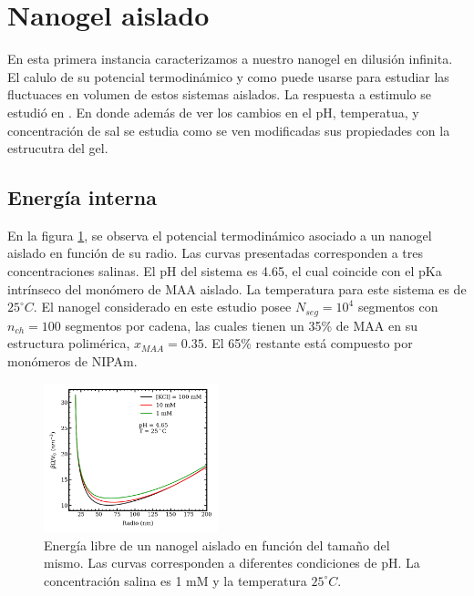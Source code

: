 	
	\section{Nanogel aislado}
	
	En esta primera instancia caracterizamos a nuestro nanogel en dilusi\'on infinita. El calulo de su potencial termodin\'amico y como puede usarse para estudiar las fluctuaces en volumen de estos sistemas aislados.
	La respuesta a estimulo se estudi\'o en \cite{perez2021thermodynamic}. En donde adem\'as de ver los cambios en el pH, temperatua, y concentraci\'on de sal se estudia como se ven modificadas sus propiedades con la estrucutra del gel.
	
	\subsection{Energ\'ia interna}
	
	En la figura \ref{fig:mc:energy-intra}, se observa el potencial termodin\'amico asociado a un nanogel aislado en funci\'on de su radio. Las curvas presentadas corresponden a tres concentraciones salinas. El pH del sistema es 4.65, el cual coincide con el pKa intr\'inseco del mon\'omero de MAA aislado. La temperatura para este sistema es de $25 ^\circ C$.
	El nanogel considerado en este estudio posee $N_{seg}=10^4$ segmentos con $n_{ch}=100$ segmentos por cadena, las cuales tienen un 35\% de MAA en su estructura polim\'erica, $x_{MAA}=0.35$. El 65\% restante est\'a compuesto por mon\'omeros de NIPAm.
	
	
	
	
	\begin{figure}[!htb]
		\centering
		\includegraphics[width=0.45\textwidth]{Figures/graph-mc/interna.png}
		\caption{Energ\'ia libre de un nanogel aislado en funci\'on del tama\~no del mismo. Las curvas corresponden a diferentes condiciones de pH. La concentraci\'on salina es 1 mM y la temperatura $25 ^\circ C$.}
		\label{fig:mc:energy-intra}
	\end{figure}
	

